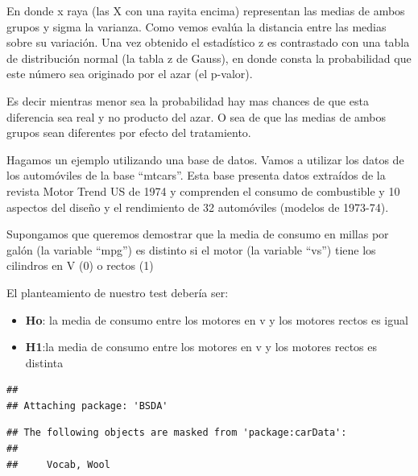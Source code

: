 \documentclass[
]{book}
\newenvironment{Shaded}{\begin{snugshade}}{\end{snugshade}}
\newcommand{\CommentTok}[1]{\textcolor[rgb]{0.56,0.35,0.01}{\textit{#1}}}
\newcommand{\FunctionTok}[1]{\textcolor[rgb]{0.00,0.00,0.00}{#1}}
\newcommand{\NormalTok}[1]{#1}
\newcommand{\OtherTok}[1]{\textcolor[rgb]{0.56,0.35,0.01}{#1}}
\newcommand{\SpecialCharTok}[1]{\textcolor[rgb]{0.00,0.00,0.00}{#1}}
\begin{document}
En donde x raya (las X con una rayita encima) representan las medias de ambos grupos y sigma la varianza. Como vemos evalúa la distancia entre las medias sobre su variación. Una vez obtenido el estadístico z es contrastado con una tabla de distribución normal (la tabla z de Gauss), en donde consta la probabilidad que este número sea originado por el azar (el p-valor).

Es decir mientras menor sea la probabilidad hay mas chances de que esta diferencia sea real y no producto del azar. O sea de que las medias de ambos grupos sean diferentes por efecto del tratamiento.

Hagamos un ejemplo utilizando una base de datos. Vamos a utilizar los datos de los automóviles de la base ``mtcars''. Esta base presenta datos extraídos de la revista Motor Trend US de 1974 y comprenden el consumo de combustible y 10 aspectos del diseño y el rendimiento de 32 automóviles (modelos de 1973-74).

Supongamos que queremos demostrar que la media de consumo en millas por galón (la variable ``mpg'') es distinto si el motor (la variable ``vs'') tiene los cilindros en V (0) o rectos (1)

El planteamiento de nuestro test debería ser:

\begin{itemize}
\item
  \textbf{Ho}: la media de consumo entre los motores en v y los motores rectos es igual
\item
  \textbf{H1}:la media de consumo entre los motores en v y los motores rectos es distinta
\end{itemize}

\begin{Shaded}
\end{Shaded}

\begin{verbatim}
## 
## Attaching package: 'BSDA'
\end{verbatim}

\begin{verbatim}
## The following objects are masked from 'package:carData':
## 
##     Vocab, Wool
\end{verbatim}
\end{document}
